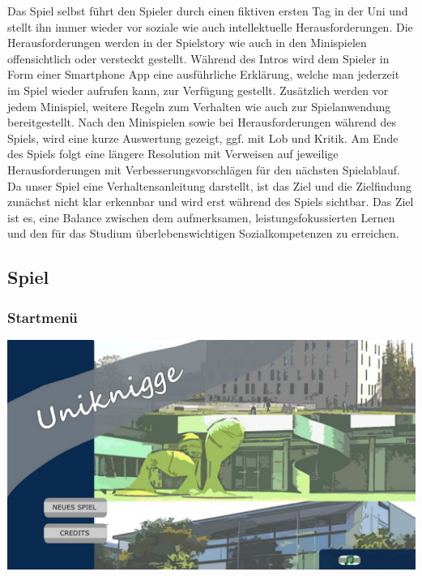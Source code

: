 \documentclass[a4paper, 11pt]{article} %
\begin{document}
Das Spiel selbst führt den Spieler durch einen fiktiven ersten Tag in der Uni und stellt ihn immer wieder vor soziale wie auch intellektuelle Herausforderungen. Die Herausforderungen werden in der Spielstory wie auch in den Minispielen offensichtlich oder versteckt gestellt. Während des Intros wird dem Spieler in Form einer Smartphone App eine ausführliche Erklärung, welche man jederzeit im Spiel wieder aufrufen kann, zur Verfügung gestellt. Zusätzlich werden vor jedem Minispiel, weitere Regeln zum Verhalten wie auch zur Spielanwendung bereitgestellt. Nach den Minispielen sowie bei Herausforderungen während des Spiels, wird eine kurze Auswertung gezeigt, ggf. mit Lob und Kritik. Am Ende des Spiels folgt eine längere Resolution mit Verweisen auf jeweilige Herausforderungen mit Verbesserungsvorschlägen für den nächsten Spielablauf. Da unser Spiel eine Verhaltensanleitung darstellt, ist das Ziel und die Zielfindung zunächst nicht klar erkennbar und wird erst während des Spiels sichtbar.
Das Ziel ist es, eine Balance zwischen dem aufmerksamen, leistungsfokussierten Lernen und den für das Studium überlebenswichtigen Sozialkompetenzen zu erreichen.

\subsection{Spiel}
\subsubsection{Startmenü}
\includegraphics[scale=0.5]{images/spiel/startmenue.png}\\\\
\end{document}
